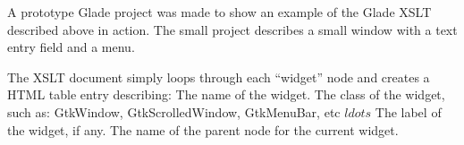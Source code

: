 \items A prototype Glade project was made to show an example of the Glade XSLT described above in action.
\subitems The small project describes a small window with a text entry field and a menu.

\items The XSLT document simply loops through each ``widget'' node and creates a HTML table entry describing:
\subitems The name of the widget.
\subitems The class of the widget, such as: GtkWindow, GtkScrolledWindow, GtkMenuBar, etc $ldots$
\subitems The label of the widget, if any.
\subitems The name of the parent node for the current widget.

\bye
